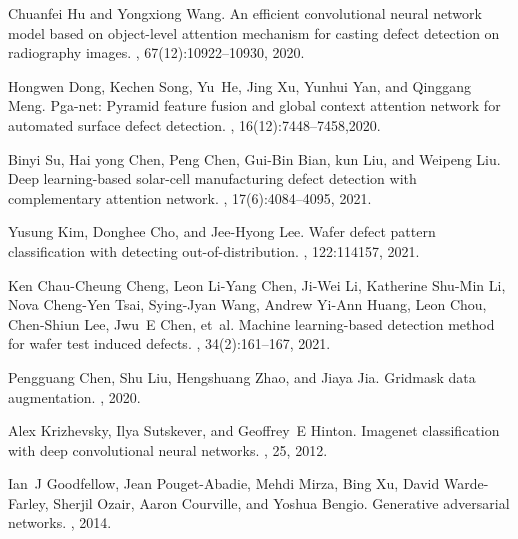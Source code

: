\documentclass[sn-mathphys]{sn-jnl}%
\theoremstyle{thmstyleone}%
\theoremstyle{thmstyletwo}%
\theoremstyle{thmstylethree}%
\begin{document}
\begin{thebibliography}{10}

Chuanfei {Hu} and Yongxiong {Wang}.
\newblock An efficient convolutional neural network model based on object-level
  attention mechanism for casting defect detection on radiography images.
,
  67(12):10922--10930, 2020.

Hongwen {Dong}, Kechen {Song}, Yu~{He}, Jing {Xu}, Yunhui {Yan}, and Qinggang
  {Meng}.
\newblock Pga-net: Pyramid feature fusion and global context attention network
  for automated surface defect detection.
, 16(12):7448--7458,2020.

Binyi {Su}, Hai yong {Chen}, Peng {Chen}, Gui-Bin {Bian}, kun {Liu}, and
  Weipeng {Liu}.
\newblock Deep learning-based solar-cell manufacturing defect detection with
  complementary attention network.
, 17(6):4084--4095,
  2021.

Yusung Kim, Donghee Cho, and Jee-Hyong Lee.
\newblock Wafer defect pattern classification with detecting
  out-of-distribution.
, 122:114157, 2021.

Ken Chau-Cheung Cheng, Leon Li-Yang Chen, Ji-Wei Li, Katherine Shu-Min Li, Nova
  Cheng-Yen Tsai, Sying-Jyan Wang, Andrew Yi-Ann Huang, Leon Chou, Chen-Shiun
  Lee, Jwu~E Chen, et~al.
\newblock Machine learning-based detection method for wafer test induced
  defects.
,
  34(2):161--167, 2021.

Pengguang Chen, Shu Liu, Hengshuang Zhao, and Jiaya Jia.
\newblock Gridmask data augmentation.
, 2020.

Alex Krizhevsky, Ilya Sutskever, and Geoffrey~E Hinton.
\newblock Imagenet classification with deep convolutional neural networks.
, 25, 2012.

Ian~J Goodfellow, Jean Pouget-Abadie, Mehdi Mirza, Bing Xu, David Warde-Farley,
  Sherjil Ozair, Aaron Courville, and Yoshua Bengio.
\newblock Generative adversarial networks.
, 2014.


\end{thebibliography}
\end{document}
